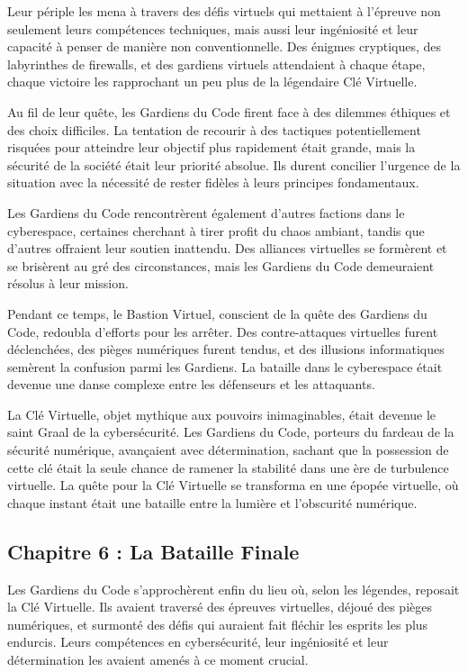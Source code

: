 \documentclass{./StyCls/MyArticle}
\begin{document}
Leur périple les mena à travers des défis virtuels qui mettaient à l'épreuve non seulement leurs compétences techniques, mais aussi leur ingéniosité et leur capacité à penser de manière non conventionnelle. Des énigmes cryptiques, des labyrinthes de firewalls, et des gardiens virtuels attendaient à chaque étape, chaque victoire les rapprochant un peu plus de la légendaire Clé Virtuelle.

Au fil de leur quête, les Gardiens du Code firent face à des dilemmes éthiques et des choix difficiles. La tentation de recourir à des tactiques potentiellement risquées pour atteindre leur objectif plus rapidement était grande, mais la sécurité de la société était leur priorité absolue. Ils durent concilier l'urgence de la situation avec la nécessité de rester fidèles à leurs principes fondamentaux.

Les Gardiens du Code rencontrèrent également d'autres factions dans le cyberespace, certaines cherchant à tirer profit du chaos ambiant, tandis que d'autres offraient leur soutien inattendu. Des alliances virtuelles se formèrent et se brisèrent au gré des circonstances, mais les Gardiens du Code demeuraient résolus à leur mission.

Pendant ce temps, le Bastion Virtuel, conscient de la quête des Gardiens du Code, redoubla d'efforts pour les arrêter. Des contre-attaques virtuelles furent déclenchées, des pièges numériques furent tendus, et des illusions informatiques semèrent la confusion parmi les Gardiens. La bataille dans le cyberespace était devenue une danse complexe entre les défenseurs et les attaquants.

La Clé Virtuelle, objet mythique aux pouvoirs inimaginables, était devenue le saint Graal de la cybersécurité. Les Gardiens du Code, porteurs du fardeau de la sécurité numérique, avançaient avec détermination, sachant que la possession de cette clé était la seule chance de ramener la stabilité dans une ère de turbulence virtuelle. La quête pour la Clé Virtuelle se transforma en une épopée virtuelle, où chaque instant était une bataille entre la lumière et l'obscurité numérique.

\subsection{Chapitre 6 : La Bataille Finale}

Les Gardiens du Code s'approchèrent enfin du lieu où, selon les légendes, reposait la Clé Virtuelle. Ils avaient traversé des épreuves virtuelles, déjoué des pièges numériques, et surmonté des défis qui auraient fait fléchir les esprits les plus endurcis. Leurs compétences en cybersécurité, leur ingéniosité et leur détermination les avaient amenés à ce moment crucial.
\end{document}
